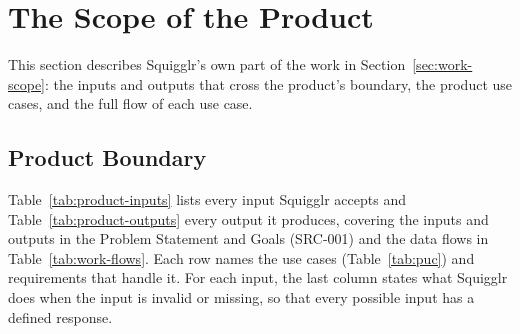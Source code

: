 \documentclass[12pt]{article}
\renewcommand{\_}{\textunderscore\allowbreak}%
\begin{document}
\section{The Scope of the Product}
\label{sec:product-scope}

This section describes Squigglr's own part of the work in
Section~\ref{sec:work-scope}: the inputs and outputs that cross the product's
boundary, the product use cases, and the full flow of each use case.

\subsection{Product Boundary}
\label{sec:product-boundary}

Table~\ref{tab:product-inputs} lists every input Squigglr accepts and
Table~\ref{tab:product-outputs} every output it produces, covering the inputs
and outputs in the Problem Statement and Goals (SRC-001) and the data flows in
Table~\ref{tab:work-flows}. Each row names the use cases (Table~\ref{tab:puc})
and requirements that handle it. For each input, the last column states what
Squigglr does when the input is invalid or missing, so that every possible input
has a defined response.
\end{document}
